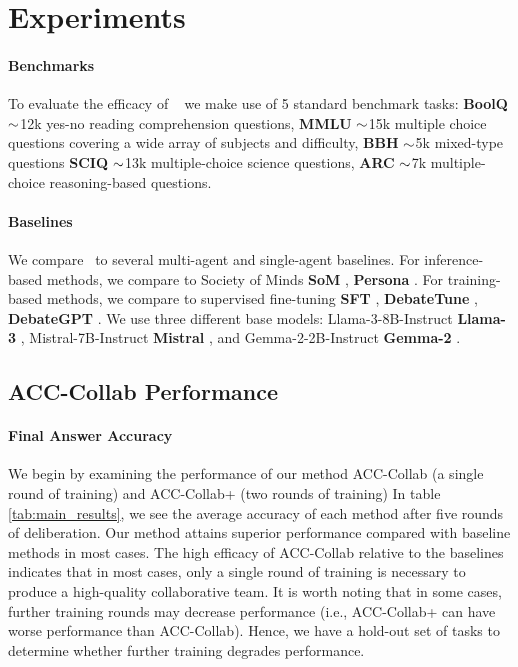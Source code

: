 \section{Experiments}\label{sec:exp}




\paragraph{Benchmarks}
To evaluate the efficacy of \ours~ we make use of 5 standard benchmark tasks:
\textbf{BoolQ} \cite{clark2019boolq} $\small{\sim}$12k yes-no reading comprehension questions, \textbf{MMLU} \cite{hendrycks2020measuring} $\small{\sim}$15k multiple choice questions covering a wide array of subjects and difficulty, \textbf{BBH} \cite{suzgun2022challenging} $\small{\sim}$5k mixed-type questions 
\textbf{SCIQ} \cite{welbl2017crowdsourcing} $\small{\sim}$13k multiple-choice science questions, \textbf{ARC} \cite{chollet2019measure} $\small{\sim}$7k multiple-choice reasoning-based questions.



\paragraph{Baselines}
We compare \ours~to several multi-agent and single-agent baselines.
For inference-based methods, we compare to Society of Minds \textbf{SoM} \cite{du2023improving}, \textbf{Persona} \cite{chan2023chateval}.
For training-based methods, we compare to supervised fine-tuning \textbf{SFT} \cite{radford2018improving}, \textbf{DebateTune} \cite{li2024can}, \textbf{DebateGPT} \cite{subramaniam2024debategpt}.
We use three different base models: Llama-3-8B-Instruct \textbf{Llama-3} \cite{dubey2024llama}, Mistral-7B-Instruct \textbf{Mistral} \cite{jiang2023mistral}, and Gemma-2-2B-Instruct \textbf{Gemma-2} \cite{team2024gemma}.



\subsection{ACC-Collab Performance}
\paragraph{Final Answer Accuracy} 
We begin by examining the performance of our method ACC-Collab (a single round of training) and ACC-Collab+ (two rounds of training)
In table \ref{tab:main_results}, we see the average accuracy of each method after five rounds of deliberation. 
Our method attains superior performance compared with baseline methods in most cases. 
The high efficacy of ACC-Collab relative to the baselines indicates that in most cases, only a single round of training is necessary to produce a high-quality collaborative team. 
It is worth noting that in some cases, further training rounds may decrease performance (i.e., ACC-Collab+ can have worse performance than ACC-Collab). 
Hence, we have a hold-out set of tasks to determine whether further training degrades performance.



